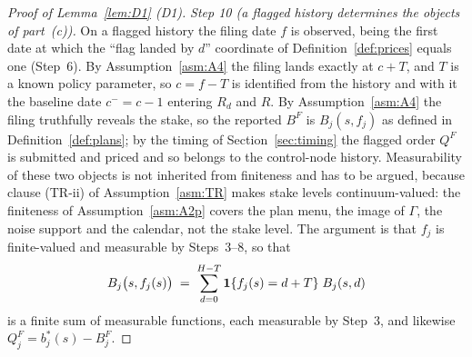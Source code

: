 \begin{proof}[Proof of Lemma~\ref{lem:D1} (D1)]
\emph{Step 10 (a flagged history determines the objects of part~(c)).} On a flagged history the
filing date $f$ is observed, being the first date at which the ``flag landed by $d$'' coordinate of
Definition~\ref{def:prices} equals one (Step~6). By Assumption~\ref{asm:A4} the filing lands exactly
at $c+T$, and $T$ is a known policy parameter, so $c = f-T$ is identified from the history and with
it the baseline date $c^- = c-1$ entering $R_d$ and $R$. By Assumption~\ref{asm:A4} the filing
truthfully reveals the stake, so the reported $B^F$ is $B_j(s,f_j)$ as defined in
Definition~\ref{def:plans}; by the timing of Section~\ref{sec:timing} the flagged order $Q^F$ is
submitted and priced and so belongs to the control-node history. Measurability of these two objects
is not inherited from finiteness and has to be argued, because clause (TR-ii) of
Assumption~\ref{asm:TR} makes stake levels continuum-valued: the finiteness of
Assumption~\ref{asm:A2p} covers the plan menu, the image of $\Gamma$, the noise support and the
calendar, not the stake level. The argument is that $f_j$ is finite-valued and measurable by
Steps~3--8, so that
\begin{equation}
\label{eq:D1-BFmeas}
B_j\bigl(s,f_j(s)\bigr) \;=\; \sum_{d=0}^{H-T} \mathbf{1}\{f_j(s) = d+T\}\;B_j(s,d)
\end{equation}
is a finite sum of measurable functions, each measurable by Step~3, and likewise
$Q_j^F = b_j^*(s) - B_j^F$.


\end{proof}

